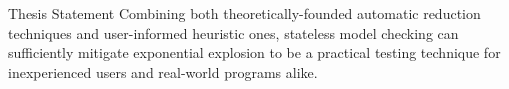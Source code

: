 \documentclass[xcolor=dvipsnames]{beamer}
\begin{document}
\begin{frame}{Thesis Statement}
	Combining both theoretically-founded automatic reduction techniques
	and user-informed heuristic ones,
	stateless model checking can sufficiently mitigate exponential explosion to be
	a practical testing technique for inexperienced users
	and real-world programs alike.
\end{frame}

\end{document}
